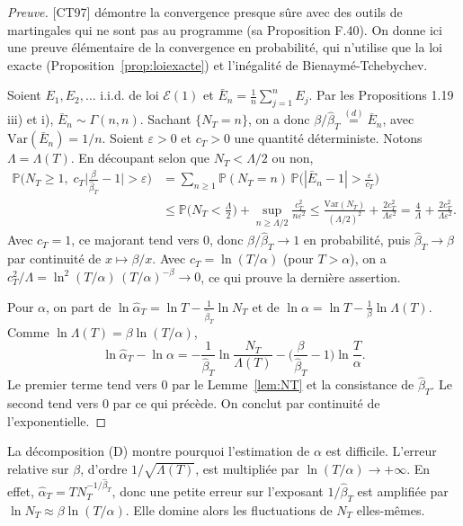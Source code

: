 \begin{proof}[Preuve]
[CT97] démontre la convergence presque sûre avec des outils de martingales qui ne sont pas au programme (sa Proposition F.40). On donne ici une preuve élémentaire de la convergence en probabilité, qui n'utilise que la loi exacte (Proposition~\ref{prop:loiexacte}) et l'inégalité de Bienaymé-Tchebychev.

Soient $E_1,E_2,\dots$ i.i.d. de loi $\mathcal{E}(1)$ et $\bar E_n=\frac1n\sum_{j=1}^nE_j$. Par les Propositions 1.19 iii) et i), $\bar E_n\sim\Gamma(n,n)$. Sachant $\{N_T=n\}$, on a donc $\beta/\hat\beta_T\overset{(d)}{=}\bar E_n$, avec $\mathrm{Var}(\bar E_n)=1/n$. Soient $\varepsilon>0$ et $c_T>0$ une quantité déterministe. Notons $\Lambda=\Lambda(T)$. En découpant selon que $N_T<\Lambda/2$ ou non,
\[
\begin{aligned}
\mathbb{P}\Big(N_T\ge1,\;c_T\Big|\frac{\beta}{\hat\beta_T}-1\Big|>\varepsilon\Big)
&=\sum_{n\ge1}\mathbb{P}(N_T=n)\,\mathbb{P}\Big(|\bar E_n-1|>\frac{\varepsilon}{c_T}\Big)\\
&\le\mathbb{P}\Big(N_T<\frac{\Lambda}{2}\Big)+\sup_{n\ge\Lambda/2}\frac{c_T^2}{n\varepsilon^2}
\le\frac{\mathrm{Var}(N_T)}{(\Lambda/2)^2}+\frac{2c_T^2}{\Lambda\varepsilon^2}
=\frac{4}{\Lambda}+\frac{2c_T^2}{\Lambda\varepsilon^2}.
\end{aligned}
\]
Avec $c_T=1$, ce majorant tend vers $0$, donc $\beta/\hat\beta_T\to1$ en probabilité, puis $\hat\beta_T\to\beta$ par continuité de $x\mapsto\beta/x$. Avec $c_T=\ln(T/\alpha)$ (pour $T>\alpha$), on a $c_T^2/\Lambda=\ln^2(T/\alpha)\,(T/\alpha)^{-\beta}\to0$, ce qui prouve la dernière assertion.

Pour $\alpha$, on part de $\ln\hat\alpha_T=\ln T-\frac{1}{\hat\beta_T}\ln N_T$ et de $\ln\alpha=\ln T-\frac1\beta\ln\Lambda(T)$. Comme $\ln\Lambda(T)=\beta\ln(T/\alpha)$,
\[
\ln\hat\alpha_T-\ln\alpha=-\frac{1}{\hat\beta_T}\ln\frac{N_T}{\Lambda(T)}-\Big(\frac{\beta}{\hat\beta_T}-1\Big)\ln\frac{T}{\alpha}. \tag{D}
\]
Le premier terme tend vers $0$ par le Lemme~\ref{lem:NT} et la consistance de $\hat\beta_T$. Le second tend vers $0$ par ce qui précède. On conclut par continuité de l'exponentielle.
\end{proof}

\begin{remarque}
La décomposition (D) montre pourquoi l'estimation de $\alpha$ est difficile. L'erreur relative sur $\beta$, d'ordre $1/\sqrt{\Lambda(T)}$, est multipliée par $\ln(T/\alpha)\to+\infty$. En effet, $\hat\alpha_T=TN_T^{-1/\hat\beta_T}$, donc une petite erreur sur l'exposant $1/\hat\beta_T$ est amplifiée par $\ln N_T\approx\beta\ln(T/\alpha)$. Elle domine alors les fluctuations de $N_T$ elles-mêmes.
\end{remarque}

